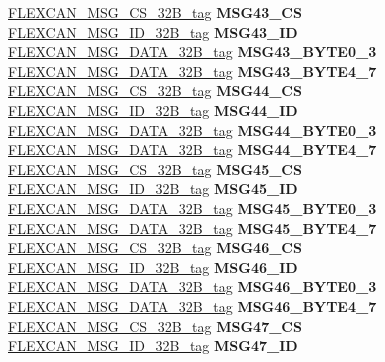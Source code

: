 \begin{DoxyCompactItemize}
\begin{tabbing}
\>\>\mbox{\hyperlink{unionFLEXCAN__MSG__CS__32B__tag}{FLEXCAN\_MSG\_CS\_32B\_tag}} {\bfseries MSG43\_CS}\\
\>\>\mbox{\hyperlink{unionFLEXCAN__MSG__ID__32B__tag}{FLEXCAN\_MSG\_ID\_32B\_tag}} {\bfseries MSG43\_ID}\\
\>\>\mbox{\hyperlink{unionFLEXCAN__MSG__DATA__32B__tag}{FLEXCAN\_MSG\_DATA\_32B\_tag}} {\bfseries MSG43\_BYTE0\_3}\\
\>\>\mbox{\hyperlink{unionFLEXCAN__MSG__DATA__32B__tag}{FLEXCAN\_MSG\_DATA\_32B\_tag}} {\bfseries MSG43\_BYTE4\_7}\\
\>\>\mbox{\hyperlink{unionFLEXCAN__MSG__CS__32B__tag}{FLEXCAN\_MSG\_CS\_32B\_tag}} {\bfseries MSG44\_CS}\\
\>\>\mbox{\hyperlink{unionFLEXCAN__MSG__ID__32B__tag}{FLEXCAN\_MSG\_ID\_32B\_tag}} {\bfseries MSG44\_ID}\\
\>\>\mbox{\hyperlink{unionFLEXCAN__MSG__DATA__32B__tag}{FLEXCAN\_MSG\_DATA\_32B\_tag}} {\bfseries MSG44\_BYTE0\_3}\\
\>\>\mbox{\hyperlink{unionFLEXCAN__MSG__DATA__32B__tag}{FLEXCAN\_MSG\_DATA\_32B\_tag}} {\bfseries MSG44\_BYTE4\_7}\\
\>\>\mbox{\hyperlink{unionFLEXCAN__MSG__CS__32B__tag}{FLEXCAN\_MSG\_CS\_32B\_tag}} {\bfseries MSG45\_CS}\\
\>\>\mbox{\hyperlink{unionFLEXCAN__MSG__ID__32B__tag}{FLEXCAN\_MSG\_ID\_32B\_tag}} {\bfseries MSG45\_ID}\\
\>\>\mbox{\hyperlink{unionFLEXCAN__MSG__DATA__32B__tag}{FLEXCAN\_MSG\_DATA\_32B\_tag}} {\bfseries MSG45\_BYTE0\_3}\\
\>\>\mbox{\hyperlink{unionFLEXCAN__MSG__DATA__32B__tag}{FLEXCAN\_MSG\_DATA\_32B\_tag}} {\bfseries MSG45\_BYTE4\_7}\\
\>\>\mbox{\hyperlink{unionFLEXCAN__MSG__CS__32B__tag}{FLEXCAN\_MSG\_CS\_32B\_tag}} {\bfseries MSG46\_CS}\\
\>\>\mbox{\hyperlink{unionFLEXCAN__MSG__ID__32B__tag}{FLEXCAN\_MSG\_ID\_32B\_tag}} {\bfseries MSG46\_ID}\\
\>\>\mbox{\hyperlink{unionFLEXCAN__MSG__DATA__32B__tag}{FLEXCAN\_MSG\_DATA\_32B\_tag}} {\bfseries MSG46\_BYTE0\_3}\\
\>\>\mbox{\hyperlink{unionFLEXCAN__MSG__DATA__32B__tag}{FLEXCAN\_MSG\_DATA\_32B\_tag}} {\bfseries MSG46\_BYTE4\_7}\\
\>\>\mbox{\hyperlink{unionFLEXCAN__MSG__CS__32B__tag}{FLEXCAN\_MSG\_CS\_32B\_tag}} {\bfseries MSG47\_CS}\\
\>\>\mbox{\hyperlink{unionFLEXCAN__MSG__ID__32B__tag}{FLEXCAN\_MSG\_ID\_32B\_tag}} {\bfseries MSG47\_ID}\\

\end{tabbing}
\end{DoxyCompactItemize}
